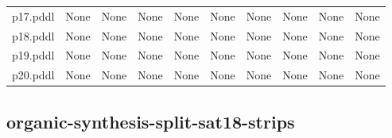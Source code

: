 \documentclass{article}
\begin{document}
\begin{tabular}{@{}lrrrrrrrrr@{}}
p17.pddl & \multicolumn{1}{|l|}{None} & \multicolumn{1}{|l|}{None} & \multicolumn{1}{|l|}{None} & \multicolumn{1}{|l|}{None} & \multicolumn{1}{|l|}{None} & \multicolumn{1}{|l|}{None} & \multicolumn{1}{|l|}{None} & \multicolumn{1}{|l|}{None} & \multicolumn{1}{|l|}{None} \\
p18.pddl & \multicolumn{1}{|l|}{None} & \multicolumn{1}{|l|}{None} & \multicolumn{1}{|l|}{None} & \multicolumn{1}{|l|}{None} & \multicolumn{1}{|l|}{None} & \multicolumn{1}{|l|}{None} & \multicolumn{1}{|l|}{None} & \multicolumn{1}{|l|}{None} & \multicolumn{1}{|l|}{None} \\
p19.pddl & \multicolumn{1}{|l|}{None} & \multicolumn{1}{|l|}{None} & \multicolumn{1}{|l|}{None} & \multicolumn{1}{|l|}{None} & \multicolumn{1}{|l|}{None} & \multicolumn{1}{|l|}{None} & \multicolumn{1}{|l|}{None} & \multicolumn{1}{|l|}{None} & \multicolumn{1}{|l|}{None} \\
p20.pddl & \multicolumn{1}{|l|}{None} & \multicolumn{1}{|l|}{None} & \multicolumn{1}{|l|}{None} & \multicolumn{1}{|l|}{None} & \multicolumn{1}{|l|}{None} & \multicolumn{1}{|l|}{None} & \multicolumn{1}{|l|}{None} & \multicolumn{1}{|l|}{None} & \multicolumn{1}{|l|}{None} \\
\end{tabular}

\hypertarget{operators-organic-synthesis-split-sat18-strips}{}
\subsection*{organic-synthesis-split-sat18-strips}
\end{document}
